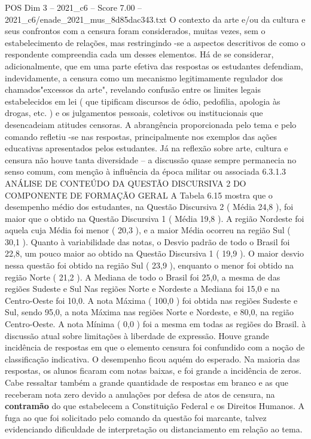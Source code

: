 \begin{textsample}{POS Dim 3 – 2021\_c6 – Score 7.00 – 2021\_c6/enade\_2021\_mus\_8d85dac343.txt}
O contexto da arte e/ou da cultura e seus confrontos com a censura foram considerados, muitas vezes, sem o estabelecimento de relações, mas restringindo -se a aspectos descritivos de como o respondente compreendia cada um desses elementos.
Há de se considerar, adicionalmente, que em uma parte efetiva das respostas os estudantes defendiam, indevidamente, a censura como um mecanismo legitimamente regulador dos chamados"excessos da arte", revelando confusão entre os limites legais estabelecidos em lei ( que tipificam discursos de ódio, pedofilia, apologia às drogas, etc. ) e os julgamentos pessoais, coletivos ou institucionais que desencadeiam atitudes censoras.
A abrangência proporcionada pelo tema e pelo comando refletiu -se nas respostas, principalmente nos exemplos das ações educativas apresentados pelos estudantes.
Já na reflexão sobre arte, cultura e censura não houve tanta diversidade – a discussão quase sempre permanecia no senso comum, com menção à influência da época militar ou associada 6.3.1.3 ANÁLISE DE CONTEÚDO DA QUESTÃO DISCURSIVA 2 DO COMPONENTE DE FORMAÇÃO GERAL A Tabela 6.15 mostra que o desempenho médio dos estudantes, na Questão Discursiva 2 ( Média 24,8 ), foi maior que o obtido na Questão Discursiva 1 ( Média 19,8 ).
A região Nordeste foi aquela cuja Média foi menor ( 20,3 ), e a maior Média ocorreu na região Sul ( 30,1 ).
Quanto à variabilidade das notas, o Desvio padrão de todo o Brasil foi 22,8, um pouco maior ao obtido na Questão Discursiva 1 ( 19,9 ).
O maior desvio nessa questão foi obtido na região Sul ( 23,9 ), enquanto o menor foi obtido na região Norte ( 21,2 ).
A Mediana de todo o Brasil foi 25,0, a mesma de das regiões Sudeste e Sul Nas regiões Norte e Nordeste a Mediana foi 15,0 e na Centro-Oeste foi 10,0.
A nota Máxima ( 100,0 ) foi obtida nas regiões Sudeste e Sul, sendo 95,0, a nota Máxima nas regiões Norte e Nordeste, e 80,0, na região Centro-Oeste.
A nota Mínima ( 0,0 ) foi a mesma em todas as regiões do Brasil. à discussão atual sobre limitações à liberdade de expressão.
Houve grande incidência de respostas em que o elemento censura foi confundido com a noção de classificação indicativa.
O desempenho ficou aquém do esperado.
Na maioria das respostas, os alunos ficaram com notas baixas, e foi grande a incidência de zeros.
Cabe ressaltar também a grande quantidade de respostas em branco e as que receberam nota zero devido a anulações por defesa de atos de censura, na \textbf{contramão} do que estabelecem a Constituição Federal e os Direitos Humanos.
A fuga ao que foi solicitado pelo comando da questão foi marcante, talvez evidenciando dificuldade de interpretação ou distanciamento em relação ao tema.

\end{textsample}
